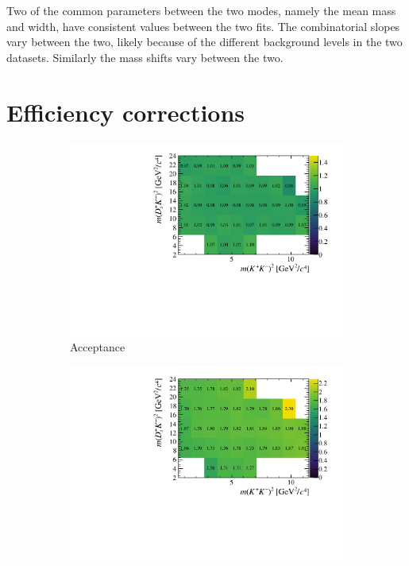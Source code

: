 Two of the common parameters between the two modes, namely the mean \Bp mass and width, have consistent values between the two fits. The combinatorial slopes vary between the two, likely because of the different background levels in the two datasets. Similarly the mass shifts vary between the two. 

\section{Efficiency corrections}
\label{sec:B2DsKK_effcorrection}

\begin{figure}[!h]
   \centering
   \begin{subfigure}[t]{0.4\textwidth}
      \includegraphics[width=1.0\textwidth]{figs/B2DsKK/Relative_Eff_gen_All_Full.pdf}
      \caption{Acceptance}
   \end{subfigure}
   \begin{subfigure}[t]{0.4\textwidth}
      \includegraphics[width=1.0\textwidth]{figs/B2DsKK/Relative_Eff_reco_All.pdf}

\end{subfigure}
\end{figure}
